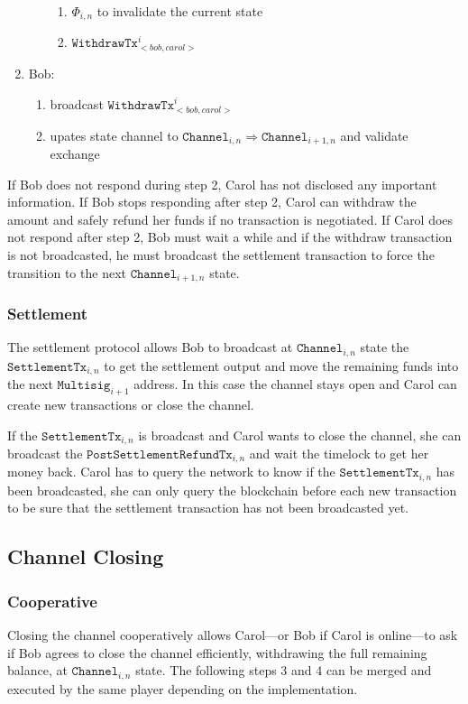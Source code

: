 \documentclass{llncs}
\begin{document}
\begin{enumerate}
\begin{enumerate}
\begin{enumerate}
    \item $\Phi_{i,n}$ to invalidate the current state
    \item $\texttt{WithdrawTx}_{<bob,carol>}^{i}$
    \end{enumerate}
  \end{enumerate}
\item Bob:
  \begin{enumerate}
  \item broadcast $\texttt{WithdrawTx}_{<bob,carol>}^{i}$
  \item upates state channel to $\texttt{Channel}_{i,n} \Rightarrow
\texttt{Channel}_{i+1,n}$ and validate exchange
  \end{enumerate}
\end{enumerate}

If Bob does not respond during step 2, Carol has not disclosed any important
information. If Bob stops responding after step 2, Carol can withdraw the amount
and safely refund her funds if no transaction is negotiated. If Carol does not
respond after step 2, Bob must wait a while and if the withdraw transaction is
not broadcasted, he must broadcast the settlement transaction to force the
transition to the next $\texttt{Channel}_{i+1,n}$ state.

\subsubsection{Settlement} The settlement protocol allows Bob to broadcast at
$\texttt{Channel}_{i,n}$ state the $\texttt{SettlementTx}_{i,n}$ to get the
settlement output and move the remaining funds into the next
$\texttt{Multisig}_{i+1}$ address. In this case the channel stays open and Carol
can create new transactions or close the channel.

If the $\texttt{SettlementTx}_{i,n}$ is broadcast and Carol wants to close the
channel, she can broadcast the $\texttt{PostSettlementRefundTx}_{i,n}$ and wait
the timelock to get her money back. Carol has to query the network to know if
the $\texttt{SettlementTx}_{i,n}$ has been broadcasted, she can only query the
blockchain before each new transaction to be sure that the settlement
transaction has not been broadcasted yet.

\subsection{Channel Closing}
\subsubsection{Cooperative} Closing the channel cooperatively allows Carol---or
Bob if Carol is online---to ask if Bob agrees to close the channel efficiently,
withdrawing the full remaining balance, at $\texttt{Channel}_{i,n}$ state. The
following steps 3 and 4 can be merged and executed by the same player depending
on the implementation.
\end{document}
